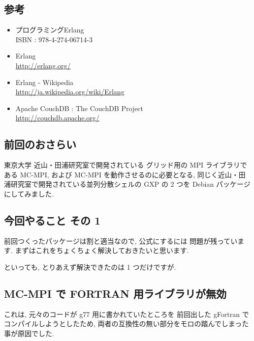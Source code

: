 \documentclass[mingoth,a4paper]{jsarticle}
\begin{document}
\begin{commandline}
\subsection{参考}
\begin{itemize}
 \item プログラミングErlang\\
       ISBN : 978-4-274-06714-3
 \item Erlang\\
       \url{http://erlang.org/}
 \item Erlang - Wikipedia\\
       \url{http://ja.wikipedia.org/wiki/Erlang}
 \item Apache CouchDB : The CouchDB Project\\
       \url{http://couchdb.apache.org/}
\end{itemize}


\subsection{前回のおさらい}

東京大学 近山・田浦研究室で開発されている
グリッド用の MPI ライブラリである MC-MPI,
および MC-MPI を動作させるのに必要となる,
同じく近山・田浦研究室で開発されている並列分散シェルの GXP
の 2 つを Debian パッケージにしてみました.

\subsection{今回やること その 1}

前回つくったパッケージは割と適当なので, 公式にするには
問題が残っています. まずはこれをちょくちょく解決しておきたいと思います.

といっても, とりあえず解決できたのは 1 つだけですが.

\subsection{MC-MPI で FORTRAN 用ライブラリが無効}

これは, 元々のコードが g77 用に書かれていたところを
前回出した gFortran でコンパイルしようとしたため,
両者の互換性の無い部分をモロの踏んでしまった事が原因でした.


\end{commandline}
\end{document}
